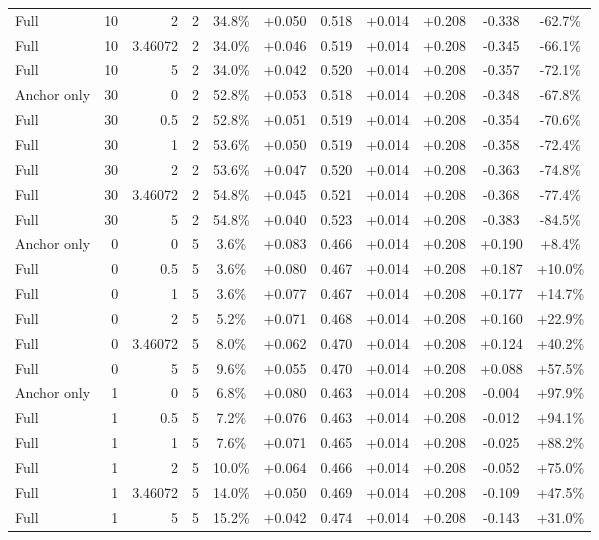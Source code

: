 \begin{table}[htbp]
\begin{tabular}{lrrrccccccc}
Full & 10 & 2 & 2 & 34.8\% & +0.050 & 0.518 & +0.014 & +0.208 & -0.338 & -62.7\% \\
Full & 10 & 3.46072 & 2 & 34.0\% & +0.046 & 0.519 & +0.014 & +0.208 & -0.345 & -66.1\% \\
Full & 10 & 5 & 2 & 34.0\% & +0.042 & 0.520 & +0.014 & +0.208 & -0.357 & -72.1\% \\
Anchor only & 30 & 0 & 2 & 52.8\% & +0.053 & 0.518 & +0.014 & +0.208 & -0.348 & -67.8\% \\
Full & 30 & 0.5 & 2 & 52.8\% & +0.051 & 0.519 & +0.014 & +0.208 & -0.354 & -70.6\% \\
Full & 30 & 1 & 2 & 53.6\% & +0.050 & 0.519 & +0.014 & +0.208 & -0.358 & -72.4\% \\
Full & 30 & 2 & 2 & 53.6\% & +0.047 & 0.520 & +0.014 & +0.208 & -0.363 & -74.8\% \\
Full & 30 & 3.46072 & 2 & 54.8\% & +0.045 & 0.521 & +0.014 & +0.208 & -0.368 & -77.4\% \\
Full & 30 & 5 & 2 & 54.8\% & +0.040 & 0.523 & +0.014 & +0.208 & -0.383 & -84.5\% \\
Anchor only & 0 & 0 & 5 & 3.6\% & +0.083 & 0.466 & +0.014 & +0.208 & +0.190 & +8.4\% \\
Full & 0 & 0.5 & 5 & 3.6\% & +0.080 & 0.467 & +0.014 & +0.208 & +0.187 & +10.0\% \\
Full & 0 & 1 & 5 & 3.6\% & +0.077 & 0.467 & +0.014 & +0.208 & +0.177 & +14.7\% \\
Full & 0 & 2 & 5 & 5.2\% & +0.071 & 0.468 & +0.014 & +0.208 & +0.160 & +22.9\% \\
Full & 0 & 3.46072 & 5 & 8.0\% & +0.062 & 0.470 & +0.014 & +0.208 & +0.124 & +40.2\% \\
Full & 0 & 5 & 5 & 9.6\% & +0.055 & 0.470 & +0.014 & +0.208 & +0.088 & +57.5\% \\
Anchor only & 1 & 0 & 5 & 6.8\% & +0.080 & 0.463 & +0.014 & +0.208 & -0.004 & +97.9\% \\
Full & 1 & 0.5 & 5 & 7.2\% & +0.076 & 0.463 & +0.014 & +0.208 & -0.012 & +94.1\% \\
Full & 1 & 1 & 5 & 7.6\% & +0.071 & 0.465 & +0.014 & +0.208 & -0.025 & +88.2\% \\
Full & 1 & 2 & 5 & 10.0\% & +0.064 & 0.466 & +0.014 & +0.208 & -0.052 & +75.0\% \\
Full & 1 & 3.46072 & 5 & 14.0\% & +0.050 & 0.469 & +0.014 & +0.208 & -0.109 & +47.5\% \\
Full & 1 & 5 & 5 & 15.2\% & +0.042 & 0.474 & +0.014 & +0.208 & -0.143 & +31.0\% \\

\end{tabular}
\end{table}
